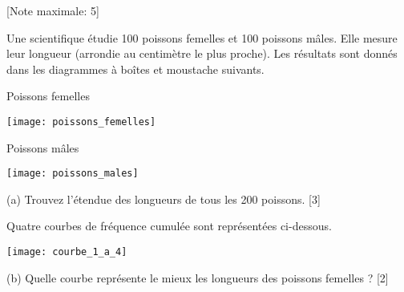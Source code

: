 \begin{question}
  \hspace*{\fill} [Note maximale: 5]\par
  \medskip

  \noindent Une scientifique étudie 100 poissons femelles et 100 poissons mâles. Elle mesure 
  leur longueur (arrondie au centimètre le plus proche). Les résultats sont donnés dans
  les diagrammes à boîtes et moustache suivants.\par
  \medskip

  \noindent Poissons femelles\par
  \medskip

  \texttt{[image: poissons\_femelles]}\par  
  \medskip

  \noindent Poissons mâles\par
  \medskip

  \texttt{[image: poissons\_males]}\par  
  \medskip

  (a) Trouvez l’étendue des longueurs de tous les 200 poissons.\hspace*{\fill} [3]\par
  \medskip

  \noindent Quatre courbes de fréquence cumulée sont représentées ci-dessous.\par
  \medskip

  \texttt{[image: courbe\_1\_a\_4]}\par  
  \medskip
  (b) Quelle courbe représente le mieux les longueurs des poissons femelles ?\hspace*{\fill} [2]\par  
\end{question}

